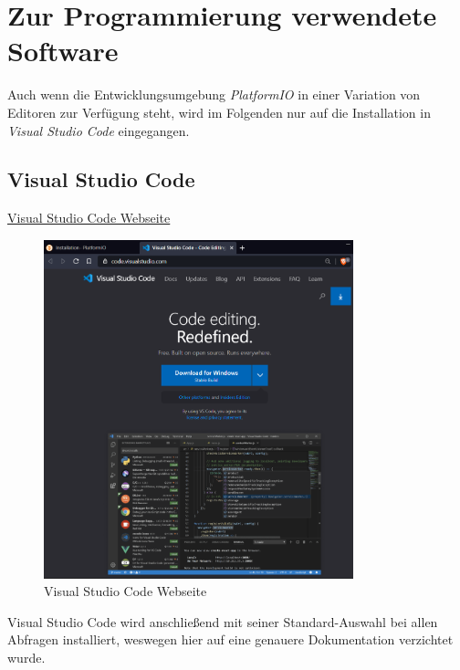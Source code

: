 \section{Zur Programmierung verwendete Software}
Auch wenn die Entwicklungsumgebung \textit{PlatformIO} in einer Variation von Editoren zur Verfügung steht, wird im Folgenden nur auf die 
Installation in \textit{Visual Studio Code} eingegangen.

\subsection{Visual Studio Code}
\href{https://code.visualstudio.com/}{Visual Studio Code Webseite}
\begin{figure}[h]
	\centering
	\includegraphics[width=0.8\textwidth]{bilder/Webseite_VSCode.png}
	\caption{Visual Studio Code Webseite}
\end{figure}

Visual Studio Code wird anschließend mit seiner Standard-Auswahl bei allen Abfragen installiert, weswegen hier auf eine genauere Dokumentation verzichtet wurde.


